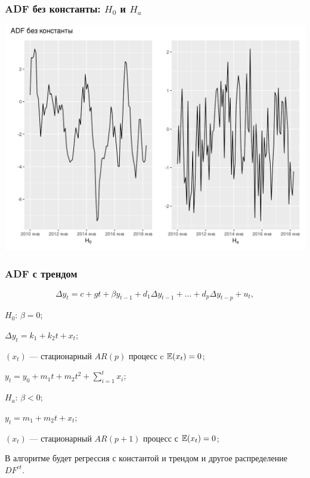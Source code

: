 \begin{frame}
  \frametitle{ADF без константы: $H_0$ и $H_a$}
  \includegraphics[width=\textwidth]{pictures/om_ts_06-055.png}

\end{frame}



\begin{frame}
  \frametitle{ADF с трендом}
  \[
  \Delta y_t = c + g t + \beta y_{t-1} + d_1 \Delta y_{t-1} + \ldots + d_p \Delta y_{t-p} + u_t,  
  \]

  \pause

  \alert{$H_0$: $\beta = 0$};
  
  $\Delta y_t = k_1 + k_2 t + x_t$;
  
  $(x_t)$ — стационарный $AR(p)$ процесс c $\mathbb{E}(x_t) = 0$;

  $y_t = y_0 + m_1 t + m_2 t^2 + \sum_{i=1}^t x_i$;

  \pause

  \alert{$H_a$: $\beta < 0$};

  $y_t = m_1 + m_2 t + x_t$;
  
  $(x_t)$ — стационарный $AR(p + 1)$ процесс с $\mathbb{E}(x_t) = 0$;

  \pause 

  В алгоритме будет регрессия \alert{с константой и трендом} и другое распределение $DF^{ct}$.

\end{frame}



